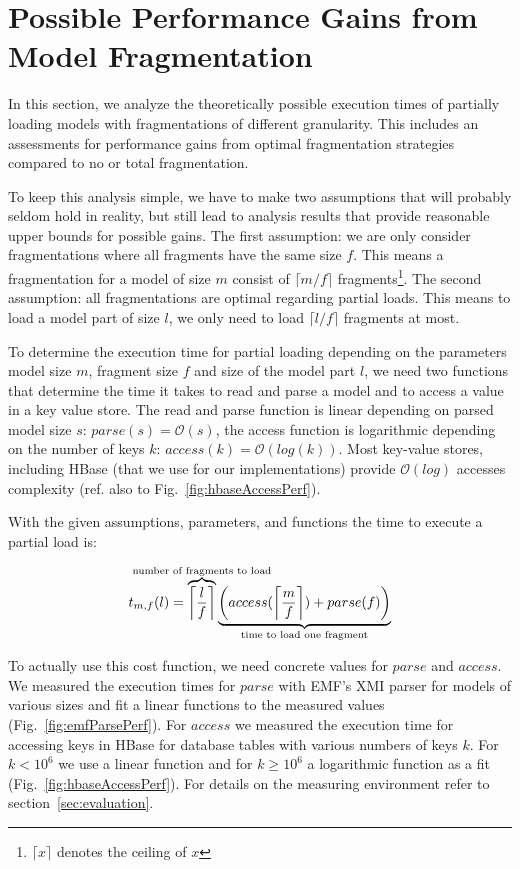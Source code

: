 \section{Possible Performance Gains from Model Fragmentation}
\label{sec:gains}

In this section, we analyze the theoretically possible execution times of partially loading models with fragmentations of different granularity. This includes an assessments for performance gains from optimal fragmentation strategies compared to no or total fragmentation.

To keep this analysis simple, we have to make two assumptions that will probably seldom hold in reality, but still lead to analysis results that provide reasonable upper bounds for possible gains.
The first assumption: we are only consider fragmentations where all fragments have the same size $f$. 
This means a fragmentation for a model of size $m$ consist of $\lceil m/f \rceil$ fragments\footnote{$\lceil x\rceil$ denotes the ceiling of $x$}. 
The second assumption: all fragmentations are optimal regarding partial loads. This means to load a model part of size $l$, we only need to load $\lceil l/f\rceil$ fragments at most.

To determine the execution time for partial loading depending on the parameters model size $m$, fragment size $f$ and size of the model part $l$, we need two functions that determine the time it takes to read and parse a model and to access a value in a key value store. The read and parse function is linear depending on parsed model size $s$: $parse(s)=\mathcal{O}\left(s\right)$, the access function is logarithmic depending on the number of keys $k$: $access(k)=\mathcal{O}(log(k))$. Most key-value stores, including HBase (that we use for our implementations) provide $\mathcal{O}(log)$ accesses complexity (ref. also to Fig.~\ref{fig:hbaseAccessPerf}).

With the given assumptions, parameters, and functions the time to execute a partial load is:

$$t_{m,f}(l)=\overbrace{\left\lceil\frac{l}{f}\right\rceil}^{\mathclap{\text{number of fragments to load}}}\underbrace{\left(access(\left\lceil\frac{m}{f}\right\rceil) + parse(f)\right)}_{\mathclap{\text{time to load one fragment}}}$$

To actually use this cost function, we need concrete values for $parse$ and $access$. We measured the execution times for $parse$ with EMF's XMI parser for models of various sizes and fit a linear functions to the measured values (Fig.~\ref{fig:emfParsePerf}). For $access$ we measured the execution time for accessing keys in HBase for database tables with various numbers of keys $k$. For $k<10^6$ we use a linear function and for $k\ge 10^6$ a logarithmic function as a fit (Fig.~\ref{fig:hbaseAccessPerf}). For details on the measuring environment refer to section~\ref{sec:evaluation}.

